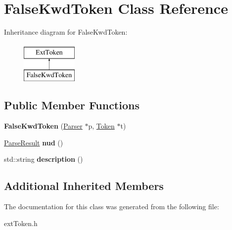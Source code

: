 \hypertarget{classFalseKwdToken}{\section{False\-Kwd\-Token Class Reference}
\label{classFalseKwdToken}
}
Inheritance diagram for False\-Kwd\-Token\-:\begin{figure}[H]
\begin{center}
\leavevmode
\includegraphics[height=2.000000cm]{classFalseKwdToken}
\end{center}
\end{figure}
\subsection*{Public Member Functions}
\begin{DoxyCompactItemize}
\item 
\hypertarget{classFalseKwdToken_add6402d29fd7b22253a0dc73370597e4}{{\bfseries False\-Kwd\-Token} (\hyperlink{classParser}{Parser} $\ast$p, \hyperlink{classToken}{Token} $\ast$t)}\label{classFalseKwdToken_add6402d29fd7b22253a0dc73370597e4}

\item 
\hypertarget{classFalseKwdToken_adc06b0433535d552c1e7f8076d756fb3}{\hyperlink{classParseResult}{Parse\-Result} {\bfseries nud} ()}\label{classFalseKwdToken_adc06b0433535d552c1e7f8076d756fb3}

\item 
\hypertarget{classFalseKwdToken_a8351fad7090214687138e113b5a581f1}{std\-::string {\bfseries description} ()}\label{classFalseKwdToken_a8351fad7090214687138e113b5a581f1}

\end{DoxyCompactItemize}
\subsection*{Additional Inherited Members}


The documentation for this class was generated from the following file\-:\begin{DoxyCompactItemize}
\item 
ext\-Token.\-h\end{DoxyCompactItemize}
